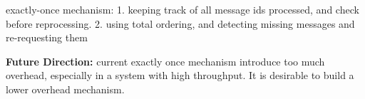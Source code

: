 exactly-once mechanism: 1. keeping track of all message ids processed, and check before reprocessing. 2. using total ordering, and detecting missing messages and re-requesting them 
 \\

\begin{table}[h]
\end{table}

 
\noindent \textbf{Future Direction:} current exactly once mechanism introduce too much overhead, especially in a system with high throughput. It is desirable to build a lower overhead mechanism. 






